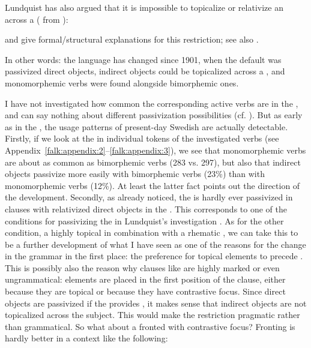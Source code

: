 \documentclass[output=paper]{langscibook}
\begin{document}
Lundquist has also argued that it is impossible to topicalize or relativize an  across a  ( from \citealt{Lundquist2004}):


\ea%
    \label{ex:falk:27}
\z
\z

\citet{HolmbergEtAl2019} and \citet{Platzack2006} give formal/structural explanations for this restriction; see also \citet{Lundquist2015}. 


In other words: the language has changed since 1901, when the default was passivized direct objects, indirect objects could be topicalized across a , and monomorphemic  verbs were found alongside bimorphemic ones.



I have not investigated how common the corresponding active  verbs are in the , and can say nothing about different passivization possibilities (cf. \citealt{HaddicanHolmberg2019}). But as early as in the , the usage patterns of present-day Swedish are actually detectable. Firstly, if we look at the  in individual tokens of the investigated verbs (see Appendix~\ref{falk:appendix:2}--\ref{falk:appendix:3}), we see that monomorphemic verbs are about as common as bimorphemic verbs (283 vs. 297), but also that indirect objects passivize more easily with bimorphemic verbs (23\%) than with monomorphemic verbs (12\%). At least the latter fact points out the direction of the development. Secondly, as already noticed, the  is hardly ever passivized in clauses with relativized direct objects in the . This corresponds to one of the conditions for passivizing the  in Lundquist’s investigation \parencite{Lundquist2004}. As for the other condition, a highly topical  in combination with a rhematic , we can take this to be a further development of what I have seen as one of the reasons for the change in the grammar in the first place: the preference for topical elements to precede . This is possibly also the reason why clauses like  are highly marked or even ungrammatical: elements are placed in the first position of the clause, either because they are topical or because they have contrastive focus. Since direct objects are passivized if the  provides , it makes sense that indirect objects are not topicalized across the subject. This would make the restriction pragmatic rather than grammatical. So what about a fronted  with contrastive focus? Fronting is hardly better in a context like the following:
\end{document}

